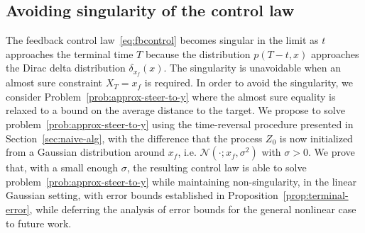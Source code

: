 \documentclass[letterpaper, 10 pt, conference]{ieeeconf}  %
\newcommand{\Ali}[1]{{\color{magenta}[Ali: #1]}}
\begin{document}
\subsection{Avoiding singularity of the control law}\label{sec:singular}
The feedback control law~\eqref{eq:fbcontrol} becomes singular in the limit as $t$ approaches the terminal time $T$ because the distribution $p(T-t,x)$ approaches the Dirac delta distribution $\delta_{x_f}(x)$. The singularity is unavoidable when an almost sure constraint $X_T=x_f$ is required. In order to avoid the singularity, we consider Problem~\ref{prob:approx-steer-to-y} where the almost sure equality is relaxed to a bound on the average distance to the target. We propose to solve problem~\ref{prob:approx-steer-to-y} using the time-reversal procedure presented in Section~\ref{sec:naive-alg}, with the difference that the process $Z_0$ is now initialized from a Gaussian distribution around $x_f$, i.e. $\mathcal N(\cdot;x_f,\sigma^2)$ with $\sigma>0$. 
We prove that, with a small enough $\sigma$, the resulting control law is able to solve problem~\ref{prob:approx-steer-to-y} while maintaining non-singularity, in the linear Gaussian setting,  with error bounds established in Proposition~\ref{prop:terminal-error},
while deferring the analysis of error bounds for the general nonlinear case to future work. 


\end{document}
